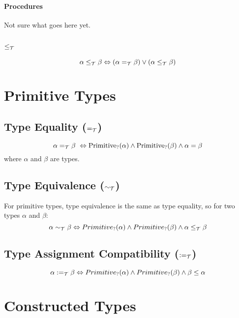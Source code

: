 \documentclass[]{article}
\begin{document}
\paragraph{Procedures}

Not sure what goes here yet.


\subsection{$\leq_{\cal T}$}

\[
\alpha \leq_{\cal T} \beta \Leftrightarrow (\alpha =_{\cal T} \beta) \vee (\alpha \leq_{\cal T} \beta)
\]

\section{Primitive Types}

\subsection{Type Equality ($=_{\cal T}$)}

\[
\alpha =_{\cal T} \beta\ \Leftrightarrow \mbox{Primitive}_?(\alpha) \wedge \mbox{Primitive}_?(\beta) \wedge \alpha = \beta
\]
where $\alpha$ and $\beta$ are types.

\subsection{Type Equivalence ($\sim_{\cal T}$)}

For primitive types, type equivalence is the same as type equality, so for two types $\alpha$ and $\beta$:
\[
\alpha \sim_{\cal T} \beta \Leftrightarrow Primitive_?(\alpha) \wedge Primitive_?(\beta) \wedge \alpha \leq_{\cal T} \beta
\]


\subsection{Type Assignment Compatibility ($:=_{\cal T}$)}

\[
\alpha :=_{\cal T} \beta \Leftrightarrow Primitive_?(\alpha) \wedge Primitive_?(\beta) \wedge  \beta \leq \alpha
\]




\section{Constructed Types}
\end{document}
